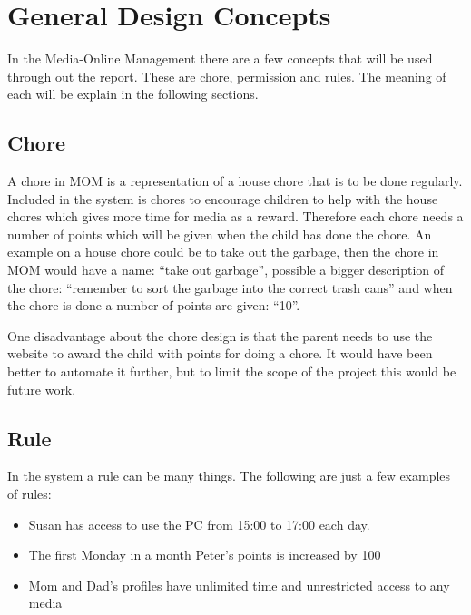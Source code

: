 \chapter{General Design Concepts}
\label{chapter:concepts}
In the Media-Online Management there are a few concepts that will be used through out the report. These are chore, permission and rules. The meaning of each will be explain in the following sections.

\section{Chore}
A chore in MOM is a representation of a house chore that is to be done regularly. Included in the system is chores to encourage children to help with the house chores which gives more time for media as a reward. Therefore each chore needs a number of points which will be given when the child has done the chore. 
An example on a house chore could be to take out the garbage, then the chore in MOM would have a name: ``take out garbage'', possible a bigger description of the chore: ``remember to sort the garbage into the correct trash cans'' and when the chore is done a number of points are given: ``10''.  

One disadvantage about the chore design is that the parent needs to use the website to award the child with points for doing a chore. It would have been better to automate it further, but to limit the scope of the project this would be future work.  
  



\section{Rule}
\label{sec:rule}
In the system a rule can be many things. The following are just a few examples of rules:

\begin{itemize}
	\item Susan has access to use the PC from 15:00 to 17:00 each day.
	\item The first Monday in a month Peter's points is increased by 100
	\item Mom and Dad's profiles have unlimited time and unrestricted access to any media
\end{itemize}

